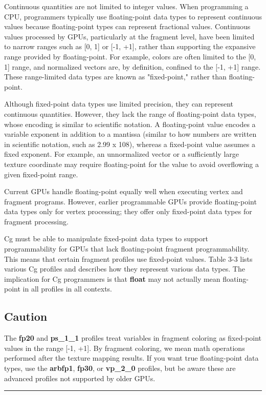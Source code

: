 \documentclass[../main.tex]{subfiles}
\begin{document}
Continuous quantities are not limited to integer values. When programming a CPU, programmers typically use floating-point data types to represent continuous values because floating-point types can represent fractional values. Continuous values processed by GPUs, particularly at the fragment level, have been limited to narrow ranges such as [0, 1] or [-1, +1], rather than supporting the expansive range provided by floating-point. For example, colors are often limited to the [0, 1] range, and normalized vectors are, by definition, confined to the [-1, +1] range. These range-limited data types are known as "fixed-point," rather than floating-point.

Although fixed-point data types use limited precision, they can represent continuous quantities. However, they lack the range of floating-point data types, whose encoding is similar to scientific notation. A floating-point value encodes a variable exponent in addition to a mantissa (similar to how numbers are written in scientific notation, such as 2.99 x 108), whereas a fixed-point value assumes a fixed exponent. For example, an unnormalized vector or a sufficiently large texture coordinate may require floating-point for the value to avoid overflowing a given fixed-point range.

Current GPUs handle floating-point equally well when executing vertex and fragment programs. However, earlier programmable GPUs provide floating-point data types only for vertex processing; they offer only fixed-point data types for fragment processing.

Cg must be able to manipulate fixed-point data types to support programmability for GPUs that lack floating-point fragment programmability. This means that certain fragment profiles use fixed-point values. Table 3-3 lists various Cg profiles and describes how they represent various data types. The implication for Cg programmers is that \textbf{float} may not actually mean floating-point in all profiles in all contexts.

\subsection*{Caution}

The \textbf{fp20} and \textbf{ps_1_1} profiles treat variables in fragment coloring as fixed-point values in the range [-1, +1]. By fragment coloring, we mean math operations performed after the texture mapping results. If you want true floating-point data types, use the \textbf{arbfp1}, \textbf{fp30}, or \textbf{vp_2_0} profiles, but be aware these are advanced profiles not supported by older GPUs.
\hrule
\end{document}

